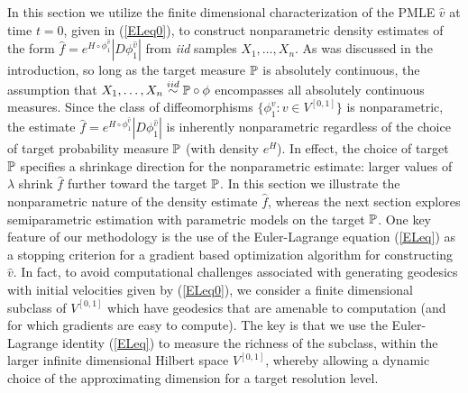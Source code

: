 \documentclass[noinfoline]{imsart}
\begin{document}
In this section we utilize the finite dimensional characterization of the PMLE $\hat v$ at time $t=0$, given in (\ref{ELeq0}), to construct nonparametric density estimates of the form $\hat f= e^{ H\circ \phi^{\hat v}_1}  |D\phi_1^{\hat v}| $ from {\em iid} samples $X_1,\ldots, X_n$.
As was discussed in the introduction, so long as the target measure $\Bbb P$ is absolutely continuous, the assumption that   $X_1,\ldots, X_n \overset{iid}\sim \Bbb  P\circ \phi$ encompasses all absolutely continuous measures. Since the class of diffeomorphisms $\{\phi_1^v\colon v\in V^{[0,1]}\}$ is nonparametric, the estimate $\hat f= e^{ H\circ \phi^{\hat v}_1}  |D\phi_1^{\hat v}| $ is inherently nonparametric regardless of the choice of target probability measure $\Bbb P$ (with density $e^H$). In effect, the choice of target $\Bbb P$ specifies a shrinkage direction for the nonparametric estimate: larger values of $\lambda$ shrink $\hat f$ further toward the target $\Bbb P$.
In this section we illustrate the nonparametric nature of the density estimate $\hat f$, whereas the next section explores semiparametric estimation with parametric models on the target $\Bbb P$.     One  key feature of our methodology is the use of the Euler-Lagrange equation (\ref{ELeq}) as a stopping criterion for a gradient based optimization algorithm for constructing $\hat v$. In fact, to avoid computational challenges associated with generating geodesics  with initial velocities given by (\ref{ELeq0}), we consider a finite dimensional subclass of $V^{[0,1]}$ which have geodesics that are amenable to computation (and for which gradients are easy to compute). The key is that we use the Euler-Lagrange identity (\ref{ELeq}) to measure the richness of the subclass, within the larger infinite dimensional Hilbert space $V^{[0,1]}$, whereby allowing a dynamic choice  of the approximating dimension for a target resolution level.
\end{document}
